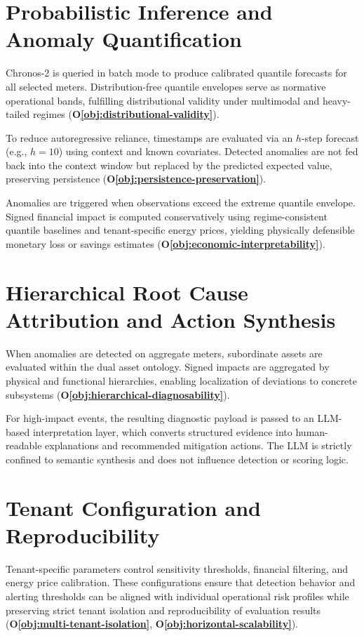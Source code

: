 \section{Probabilistic Inference and Anomaly Quantification}

Chronos-2 is queried in batch mode to produce calibrated quantile forecasts for all selected meters. Distribution-free quantile envelopes serve as normative operational bands, fulfilling distributional validity under multimodal and heavy-tailed regimes (\textbf{O\ref{obj:distributional-validity}}).

To reduce autoregressive reliance, timestamps are evaluated via an $h$-step forecast
(e.g., $h=10$) using context and known covariates. Detected anomalies are not fed
back into the context window but replaced by the predicted expected value, preserving
persistence (\textbf{O\ref{obj:persistence-preservation}}).

Anomalies are triggered when observations exceed the extreme quantile envelope. Signed financial impact is computed conservatively using regime-consistent quantile baselines and tenant-specific energy prices, yielding physically defensible monetary loss or savings estimates (\textbf{O\ref{obj:economic-interpretability}}).

\section{Hierarchical Root Cause Attribution and Action Synthesis}

When anomalies are detected on aggregate meters, subordinate assets are evaluated within the dual asset ontology. Signed impacts are aggregated by physical and functional hierarchies, enabling localization of deviations to concrete subsystems (\textbf{O\ref{obj:hierarchical-diagnosability}}).

For high-impact events, the resulting diagnostic payload is passed to an \ac{LLM}-based interpretation layer, which converts structured evidence into human-readable explanations and recommended mitigation actions. The \ac{LLM} is strictly confined to semantic synthesis and does not influence detection or scoring logic.

\section{Tenant Configuration and Reproducibility}

Tenant-specific parameters control sensitivity thresholds, financial filtering, and energy price calibration. These configurations ensure that detection behavior and alerting thresholds can be aligned with individual operational risk profiles while preserving strict tenant isolation and reproducibility of evaluation results (\textbf{O\ref{obj:multi-tenant-isolation}}, \textbf{O\ref{obj:horizontal-scalability}}).

